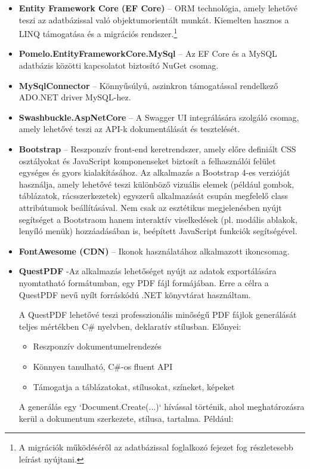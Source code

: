 \begin{itemize}
	\item \textbf{Entity Framework Core (EF Core)} – ORM technológia, amely lehetővé teszi az adatbázissal való objektumorientált munkát. Kiemelten hasznos a LINQ támogatása és a migrációs rendszer.\footnote{A migrációk működéséről az adatbázissal foglalkozó fejezet fog részletesebb leírást nyújtani.}
	\item \textbf{Pomelo.EntityFrameworkCore.MySql} – Az EF Core és a MySQL adatbázis közötti kapcsolatot biztosító NuGet csomag.
	\item \textbf{MySqlConnector} – Könnyűsúlyú, aszinkron támogatással rendelkező ADO.NET driver MySQL-hez.
	\item \textbf{Swashbuckle.AspNetCore} – A Swagger UI integrálására szolgáló csomag, amely lehetővé teszi az API-k dokumentálását és tesztelését.
	\item \textbf{Bootstrap} – Reszponzív front-end keretrendszer, amely előre definiált CSS osztályokat és JavaScript komponenseket biztosít a felhasználói felület egységes és gyors kialakításához. Az alkalmazás a Bootstrap 4-es verzióját használja, amely lehetővé teszi különböző vizuális elemek (például gombok, táblázatok, rácsszerkezetek) egyszerű alkalmazását csupán megfelelő class attribútumok beállításával. Nem csak az esztétikus megjelenésben nyújt segítséget a Bootstraom hanem interaktív viselkedések (pl. modális ablakok, lenyíló menük) hozzáadásában is, beépített JavaScript funkciók segítségével.
	\item \textbf{FontAwesome (CDN)} – Ikonok használatához alkalmazott ikoncsomag.
	\item \textbf{QuestPDF} -Az alkalmazás lehetőséget nyújt az adatok exportálására nyomtatható formátumban, egy PDF fájl formájában. Erre a célra a QuestPDF nevű nyílt forráskódú .NET könyvtárat használtam.
	
	A QuestPDF lehetővé teszi professzionális minőségű PDF fájlok generálását teljes mértékben C\# nyelvben, deklaratív stílusban. Előnyei:
	\begin{itemize}
		\item Reszponzív dokumentumelrendezés
		\item Könnyen tanulható, C\#-os fluent API
		\item Támogatja a táblázatokat, stílusokat, színeket, képeket
	\end{itemize}

A generálás egy `Document.Create(...)` hívással történik, ahol meghatározásra kerül a dokumentum szerkezete, stílusa, tartalma. Például:
	

\end{itemize}
